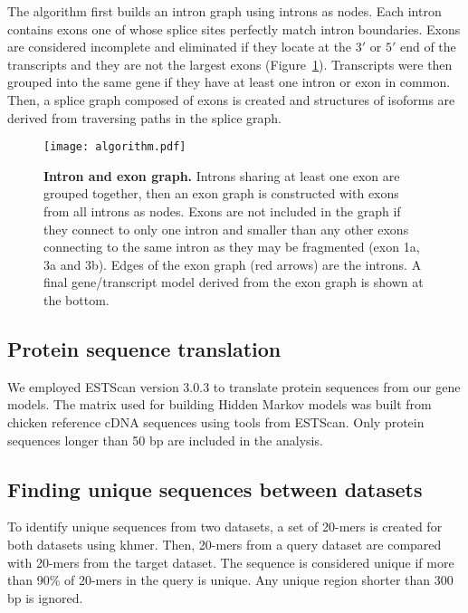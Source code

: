 The algorithm first builds an intron graph using introns as nodes.  Each intron
contains exons one of whose splice sites perfectly match intron boundaries.
Exons are considered incomplete and eliminated if they locate at the $3'$ or
$5'$ end of the transcripts and they are not the largest exons
(Figure~\ref{algorithm}).  Transcripts were then grouped into the same gene if
they have at least one intron or exon in common.  Then, a splice graph composed
of exons is created and structures of isoforms are derived from traversing
paths in the splice graph.

\begin{figure}[!ht]
\begin{center}
\texttt{[image: algorithm.pdf]}
\end{center}
\caption{
\textbf{Intron and exon graph.}
Introns sharing at least one exon are grouped together, then an
exon graph is constructed with exons from all introns as nodes.
Exons are not included in the graph if they connect to only one
intron and smaller than any other exons connecting to the same
intron as they may be fragmented (exon 1a, 3a and 3b).  Edges of
the exon graph (red arrows) are the introns.  A final
gene/transcript model derived from the exon graph is shown at the
bottom. 
}
\label{algorithm}
\end{figure}


\subsection{Protein sequence translation}

We employed ESTScan version 3.0.3 to translate protein sequences from our gene
models.  The matrix used for building Hidden Markov models was built from chicken
reference cDNA sequences using tools from ESTScan. Only protein sequences longer
than 50 bp are included in the analysis.

\subsection{Finding unique sequences between datasets}

To identify unique sequences from two datasets, a set of 20-mers is created for
both datasets using khmer.  Then, 20-mers from a query dataset are
compared with 20-mers from the target dataset.  The sequence is considered
unique if more than 90\% of 20-mers in the query is unique.  Any unique region
shorter than 300 bp is ignored.

